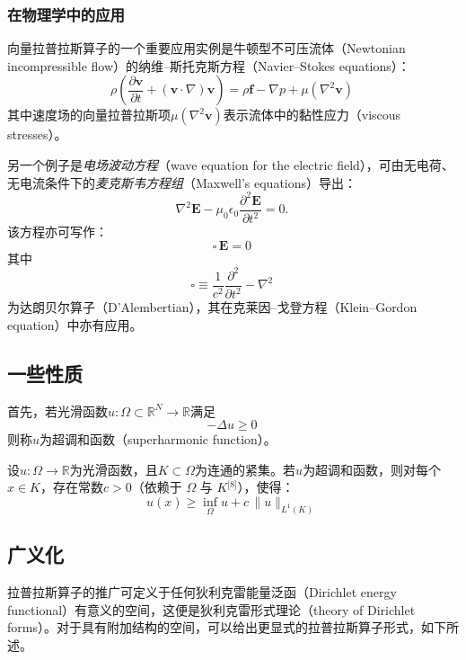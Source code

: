 \subsubsection{在物理学中的应用}
向量拉普拉斯算子的一个重要应用实例是牛顿型不可压流体（Newtonian incompressible flow）的纳维–斯托克斯方程（Navier–Stokes equations）：
\[
\rho \left(
  \frac{\partial \mathbf{v}}{\partial t}
  + (\mathbf{v} \cdot \nabla) \mathbf{v}
\right)
= \rho \mathbf{f}
- \nabla p
+ \mu (\nabla^{2} \mathbf{v})~
\]
其中速度场的向量拉普拉斯项$\mu (\nabla^{2} \mathbf{v})$表示流体中的黏性应力（viscous stresses）。

另一个例子是\emph{电场波动方程}（wave equation for the electric field），可由无电荷、无电流条件下的\emph{麦克斯韦方程组}（Maxwell’s equations）导出：
\[
\nabla^{2} \mathbf{E}
- \mu_{0} \epsilon_{0}
  \frac{\partial^{2} \mathbf{E}}{\partial t^{2}}
= 0.~
\]
该方程亦可写作：
\[
\square \, \mathbf{E} = 0~
\]
其中
\[
\square \equiv \frac{1}{c^{2}} \frac{\partial^{2}}{\partial t^{2}} - \nabla^{2}~
\]
为达朗贝尔算子（D’Alembertian），其在克莱因–戈登方程（Klein–Gordon equation）中亦有应用。
\subsection{一些性质}
首先，若光滑函数$u : \Omega \subset \mathbb{R}^{N} \to \mathbb{R}$满足
\[
- \Delta u \geq 0~
\]
则称$u$为超调和函数（superharmonic function）。

设$u : \Omega \to \mathbb{R}$为光滑函数，且$K \subset \Omega$为连通的紧集。若$u$为超调和函数，则对每个$x \in K$，存在常数$c > 0$（依赖于 $\Omega$ 与 $K$\(^\text{[8]}\)），使得：
\[
u(x) \geq \inf_{\Omega} u + c \, \lVert u \rVert_{L^{1}(K)}~
\]
\subsection{广义化}
拉普拉斯算子的推广可定义于任何狄利克雷能量泛函（Dirichlet energy functional）有意义的空间，这便是狄利克雷形式理论（theory of Dirichlet forms）。对于具有附加结构的空间，可以给出更显式的拉普拉斯算子形式，如下所述。
